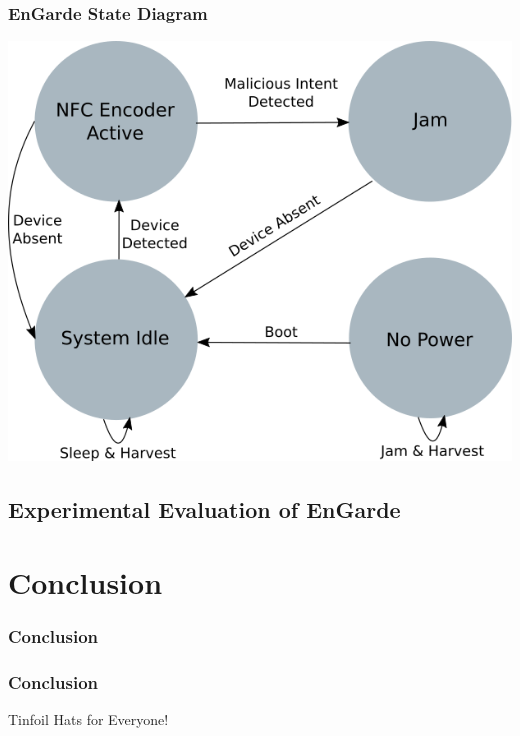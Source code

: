 \documentclass[unknownkeysallowed]{beamer}
\begin{document}
\begin{frame}
\frametitle{EnGarde State Diagram}
\begin{center}
  \includegraphics[width=.8\linewidth,height=.7\textheight,keepaspectratio]{figures/engarde/states5.png}
\end{center}
\end{frame}

\subsection{Experimental Evaluation of EnGarde}


\section{Conclusion}
\begin{frame}
\frametitle{Conclusion}
\begin{center}\begin{minipage}{.9\textwidth}
\tableofcontents[currentsubsection, hideothersubsections, sectionstyle=show/shaded]
\end{minipage}\end{center}
\end{frame}
%
\begin{frame}
  \frametitle{Conclusion}
  \begin{block}{Tinfoil Hats for Everyone!}
  \end{block}
\end{frame}
\end{document}
